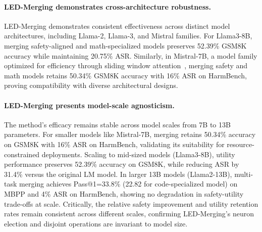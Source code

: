 \paragraph{LED-Merging demonstrates cross-architecture robustness.}
LED-Merging demonstrates consistent effectiveness across distinct model architectures, including Llama-2, Llama-3, and Mistral families.
For Llama3-8B, merging safety-aligned and math-specialized models preserves 52.39\% GSM8K accuracy while maintaining 20.75\% ASR.
Similarly, in Mistral-7B, a model family optimized for efficiency through sliding window attention~\cite{jiang2023mistral7b}, merging safety and math models retains 50.34\% GSM8K accuracy with 16\% ASR on HarmBench, proving compatibility with diverse architectural designs.






\paragraph{LED-Merging presents model-scale agnosticism.}
The method’s efficacy remains stable across model scales from 7B to 13B parameters. 
For smaller models like Mistral-7B, merging retains 50.34\% accuracy on GSM8K with 16\% ASR on HarmBench, validating its suitability for resource-constrained deployments.
Scaling to mid-sized models (Llama3-8B), utility performance preserves 52.39\% accuracy on GSM8K, while reducing ASR by 31.4\% versus the original LM model. 
In larger 13B models (Llama2-13B), multi-task merging achieves Pass@1=33.8\% (22.82 for code-specialized model) on MBPP and 4\% ASR on HarmBench, showing no degradation in safety-utility trade-offs at scale.
Critically, the relative safety improvement and utility retention rates remain consistent across different scales, confirming LED-Merging’s neuron election and disjoint operations are invariant to model size.



